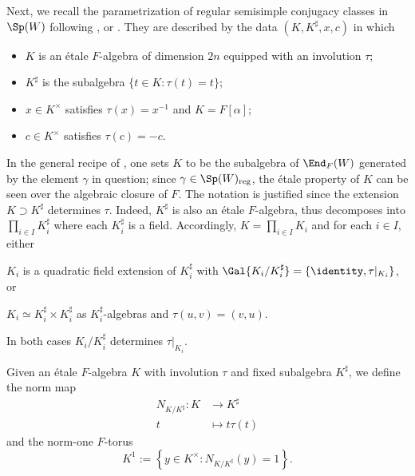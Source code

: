 \documentclass[a4paper,10pt]{article}
\begin{document}
Next, we recall the parametrization of regular semisimple conjugacy classes in $\Sp(W)$ following \cite[IV.2]{SS70}, \cite{Wa01} or \cite[\S 3]{Li11}. They are described by the data $(K, K^\sharp, x, c)$ in which 
\begin{itemize}
	\item $K$ is an étale $F$-algebra of dimension $2n$ equipped with an involution $\tau$;
	\item $K^\sharp$ is the subalgebra $\{ t \in K: \tau(t)=t\}$;
	\item $x \in K^\times$ satisfies $\tau(x) = x^{-1}$ and $K=F[\alpha]$;
	\item $c \in K^\times$ satisfies $\tau(c) = -c$.
\end{itemize}
In the general recipe of \cite[IV.1]{SS70}, one sets $K$ to be the subalgebra of $\End_F(W)$ generated by the element $\gamma$ in question; since $\gamma \in \Sp(W)_\text{reg}$, the étale property of $K$ can be seen over the algebraic closure of $F$. The notation is justified since the extension $K \supset K^\sharp$ determines $\tau$. Indeed, $K^\sharp$ is also an étale $F$-algebra, thus decomposes into $\prod_{i \in I} K_i^\sharp$ where each $K_i^\sharp$ is a field. Accordingly, $K = \prod_{i \in I} K_i$ and for each $i \in I$, either
\begin{compactenum}[(a)]
	\item $K_i$ is a quadratic field extension of $K_i^\sharp$ with $\Gal{K_i/K_i^\sharp} = \{\identity, \tau|_{K_i} \}$, or
	\item $K_i \simeq K_i^\sharp \times K_i^\sharp$ as $K_i^\sharp$-algebras and $\tau(u,v)=(v,u)$.
\end{compactenum}
In both cases $K_i/K_i^\sharp$ determines $\tau|_{K_i}$.

\begin{notation}\label{nota:norm}
	Given an étale $F$-algebra $K$ with involution $\tau$ and fixed subalgebra $K^\sharp$, we define the norm map
	\begin{align*}
		N_{K/K^\sharp}: K & \longrightarrow K^\sharp \\
		t & \longmapsto t\tau(t)
	\end{align*}
	and the norm-one $F$-torus
	\[ K^1 := \left\{ y \in K^\times: N_{K/K^\sharp}(y)=1 \right\}. \]
\end{notation}
\end{document}
